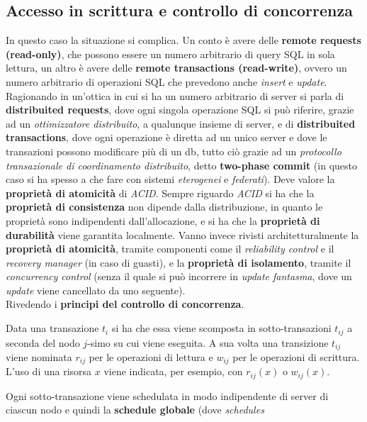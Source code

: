 \documentclass[a4paper,12pt, oneside]{book}
\begin{document}
\subsection{Accesso in scrittura e controllo di concorrenza}
In questo caso la situazione si complica. Un conto è avere delle \textbf{remote
  requests (read-only)}, che possono essere un numero arbitrario di query SQL in
sola lettura, un altro è avere delle \textbf{remote transactions (read-write)},
ovvero un numero arbitrario di operazioni SQL che prevedono anche
\textit{insert} e \textit{update}. Ragionando in un'ottica in cui si ha un
numero arbitrario di server si parla di \textbf{distribuited requests}, dove
ogni singola operazione SQL si può riferire, grazie ad un \textit{ottimizzatore
distribuito}, a qualunque insieme di server, e di \textbf{distribuited
transactions}, dove ogni operazione è diretta ad un unico server e dove le
transazioni possono modificare più di un db, tutto ciò grazie ad un
\textit{protocollo transazionale di coordinamento distribuito}, detto
\textbf{two-phase commit} (in questo caso si ha spesso a che fare con sistemi
\textit{eterogenei} e \textit{federati}). Deve valore la \textbf{proprietà di
  atomicità} di \textit{ACID}. Sempre riguardo \textit{ACID} si ha che la
\textbf{proprietà di consistenza} non dipende dalla distribuzione, in quanto le
proprietà sono indipendenti dall'allocazione, e si ha che la \textbf{proprietà
  di durabilità} viene garantita localmente. Vanno invece rivisti
architetturalmente la \textbf{proprietà di atomicità}, tramite componenti come
il \textit{reliability control} e il \textit{recovery manager} (in caso di
guasti), e la \textbf{proprietà di isolamento}, tramite il \textit{concurrency
  control} (senza il quale si può incorrere in \textit{update fantasma}, dove un
\textit{update} viene cancellato da uno seguente).\\ 
Rivedendo i \textbf{principi del controllo di concorrenza}.
\begin{definizione}
  Data una transazione $t_i$ si ha che essa viene scomposta in sotto-transazioni
  $t_{ij}$ a seconda del nodo $j$-simo su cui viene eseguita. A sua volta una
  transizione $t_{ij}$ viene nominata $r_{ij}$ per le operazioni di lettura e
  $w_{ij}$ per le operazioni di scrittura. L'uso di una risorsa $x$ viene
  indicata, per esempio, con $r_{ij}(x)$ o $w_{ij}(x)$.
\end{definizione}
Ogni sotto-transazione viene schedulata in modo indipendente di server di
ciascun nodo e quindi la \textbf{schedule globale} (dove \textit{schedules}
\end{document}

